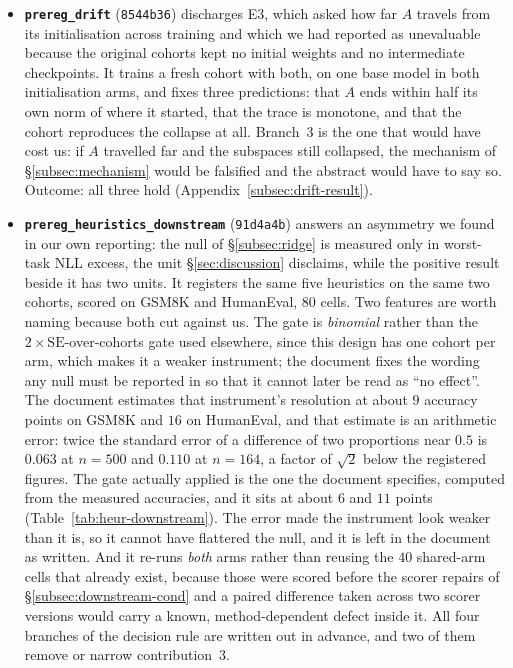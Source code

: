 \begin{itemize}
\item \textbf{\texttt{prereg\_drift}} (\texttt{8544b36}) discharges E3,
which asked how far $A$ travels from its initialisation across training and
which we had reported as unevaluable because the original cohorts kept no
initial weights and no intermediate checkpoints. It trains a fresh cohort with
both, on one base model in both initialisation arms, and fixes three
predictions: that $A$ ends within half its own norm of where it started, that
the trace is monotone, and that the cohort reproduces the collapse at all.
Branch~3 is the one that would have cost us: if $A$ travelled far and the
subspaces still collapsed, the mechanism of \S\ref{subsec:mechanism} would be
falsified and the abstract would have to say so. Outcome: all three hold
(Appendix~\ref{subsec:drift-result}).

\item \textbf{\texttt{prereg\_heuristics\_downstream}} (\texttt{91d4a4b})
answers an asymmetry we found in our own reporting: the null of
\S\ref{subsec:ridge} is measured only in worst-task NLL excess, the unit
\S\ref{sec:discussion} disclaims, while the positive result beside it has
two units. It registers the same five heuristics on the same two cohorts,
scored on GSM8K and HumanEval, $80$ cells. Two features are worth naming
because both cut against us. The gate is \emph{binomial} rather than the
$2\times\mathrm{SE}$-over-cohorts gate used elsewhere, since this design has
one cohort per arm, which makes it a weaker instrument; the document fixes
the wording any null must be reported in so that it cannot later be read as
``no effect''. The document estimates that instrument's resolution at about
$9$ accuracy points on GSM8K and $16$ on HumanEval, and that estimate is an
arithmetic error: twice the standard error of a difference of two
proportions near $0.5$ is $0.063$ at $n = 500$ and $0.110$ at $n = 164$, a
factor of $\sqrt 2$ below the registered figures. The gate actually applied
is the one the document specifies, computed from the measured accuracies,
and it sits at about $6$ and $11$ points (Table~\ref{tab:heur-downstream}).
The error made the instrument look weaker than it is, so it cannot have
flattered the null, and it is left in the document as written. And it re-runs \emph{both}
arms rather than reusing the $40$ shared-arm cells that already exist,
because those were scored before the scorer repairs of
\S\ref{subsec:downstream-cond} and a paired difference taken across two
scorer versions would carry a known, method-dependent defect inside it. All
four branches of the decision rule are written out in advance, and two of
them remove or narrow contribution~3.
\end{itemize}


